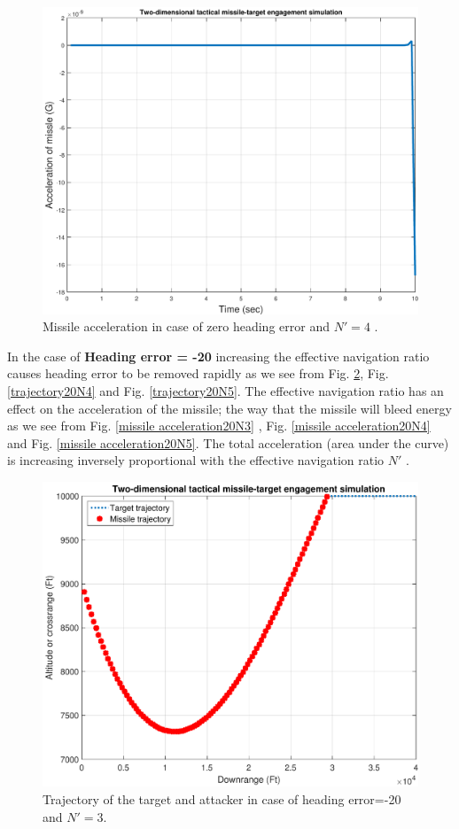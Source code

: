 \begin{figure}[htb]
	\centering
	\includegraphics[scale = 0.75]{fig/MissileAcceleration0N4.pdf}
	\caption{Missile acceleration in case of zero heading error and $N'=4$ .}
	\label{missile acceleration0N4}
\end{figure}


In the case of \textbf{Heading error = -20} increasing the effective navigation ratio causes heading error to be removed rapidly as we see from  Fig. \ref{trajectory20N3}, Fig. \ref{trajectory20N4} and Fig. \ref{trajectory20N5}. The effective navigation ratio has an effect on the acceleration of the missile; the way that the missile will bleed energy as we see from Fig. \ref{missile acceleration20N3} , Fig. \ref{missile acceleration20N4} and Fig. \ref{missile acceleration20N5}. The total acceleration (area under the curve) is increasing inversely proportional with the effective navigation ratio $N'$ .


\begin{figure}[htb]
	\centering
	\includegraphics[scale = 0.75]{fig/trajectory20N3.pdf}
	\caption{Trajectory of the target and attacker in case of heading error=-20 and $N'=3$.}
	\label{trajectory20N3}
\end{figure}

